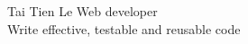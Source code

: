 \bigbreak
{\Huge Tai Tien Le}
\bigbreak
Web developer\\
Write effective, testable and reusable code
